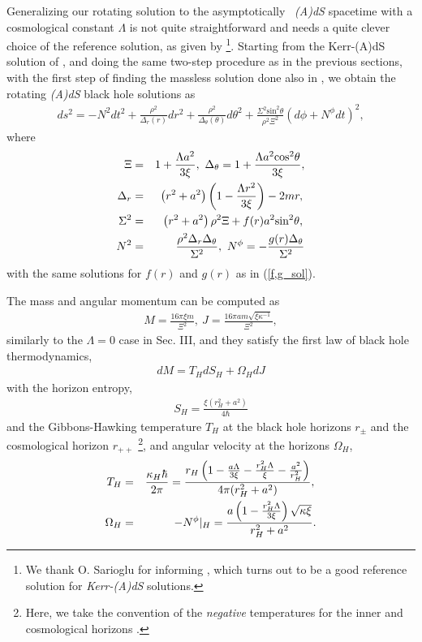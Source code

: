 \documentclass[preprint,aps,tightenlines,showkeys,nofootinbib,superscriptaddress]{revtex4}
\newcommand{\beq}{\begin{eqnarray}}
\newcommand{\eeq}{\end{eqnarray}}
\newcommand{\De}{\Delta}
\newcommand{\ka}{\kappa}
\newcommand{\La}{{\Lambda}}
\newcommand{\Si}{{\Sigma}}
\newcommand{\Om}{{\Omega}}
\newcommand{\no}{{\nonumber}}
\newcommand{\f}{\frac}
\newcommand{\asy}{asymptotically}
\begin{document}
Generalizing our rotating solution to the \asy~ {\it(A)dS} spacetime with a cosmological constant $\La$ is not quite straightforward and needs a quite clever choice of the reference solution, as given by \cite{Gibb:2004} \footnote{We thank O. Sarioglu for informing \cite{Gibb:2004}, which turns out to be a good reference solution for {\it Kerr-(A)dS} solutions.}. Starting from the Kerr-(A)dS solution of \cite{Gibb:2004}, and doing the same two-step procedure as in the previous sections, with the first step of finding the massless solution
done also in \cite{Park:2023}, we obtain the rotating {\it (A)dS} black hole solutions as
\beq
ds^2=-N^2 dt^2+\frac{\rho^2}{\Delta_r (r)}dr^2+ \frac{\rho^2}{\Delta_{\theta} (\theta)} d \theta^2
+\frac{\Sigma^2 \mbox{sin}^2\theta}{\rho^2 \Xi^2 }
\left(d\phi+ N^{\phi} dt \right)^2,
\label{KAdS_ansatz}
\eeq
where
\begin{eqnarray}
{\Xi}&=&1+\f{\La a^2 }{ 3 \xi}, ~
{\Delta}_\theta = 1+\f{\La a^2 \mbox{cos}^2 \theta}{ 3 \xi},\nonumber \\
{\Delta}_r &=& \left( r^2 + a^2 \right) \left(1 -\f{\La r^2}{3 \xi}\right)-2mr, \no \\
{\Sigma}^2 &=& \left( r^2 + a^2 \right) \rho^2 {\Xi}+f(r) a^2 \mbox{sin}^2\theta, \no \\
N^2 &=&\frac{\rho^2 \Delta_r \De_\theta}{\Sigma^2},~
N^{\phi}=-\f{g(r) \De_{\theta} }{\Si^2}
\label{KAdS_sol}
\end{eqnarray}
with the same solutions for $f(r)$ and $g(r)$ as in (\ref{f,g_sol}).

The mass and angular momentum can be computed  as
\beq
M=\f{16 \pi \xi m}{\Xi^2}, ~J=\f{16 \pi a m \sqrt{\xi \ka^{-1}}}{\Xi^2},
\label{M,J_KdS}
\eeq
similarly to the $\La=0$ case in Sec. III, and they satisfy the first law of black hole
thermodynamics,
\beq
dM=T_H dS_H +\Om_{H} dJ
\label{1st law}
\eeq
with the horizon entropy,
\beq
S_H=\f{\xi (r_{H}^2+a^2)}{4 \hbar}
\eeq
and the Gibbons-Hawking temperature $T_H$ at the black hole horizons $r_{\pm}$ and the cosmological horizon $r_{++}$
\footnote{Here, we take the convention of the {\it negative} temperatures for
the inner and cosmological horizons
\cite{Curi:1979,Klemm:2004,Park:2006,Cveti:2018}.}, and angular velocity at the horizons $\Om_H$,
\beq
T_H&=&\f{\ka_{H} \hbar}{2 \pi}=\f{r_H \left(1-\f{a \La}{3 \xi}-\f{r_H^2 \La}{\xi}-\f{a^2}{r_H^2} \right)}{4 \pi(r_H^2+a^2)}, \no \\
\Om_{H}&=&-N^{\phi}|_H=\f{a \left(1-\f{r_H^2 \La}{3 \xi} \right) \sqrt{\ka \xi}}{r_H^2+a^2}.
\eeq
\end{document}
